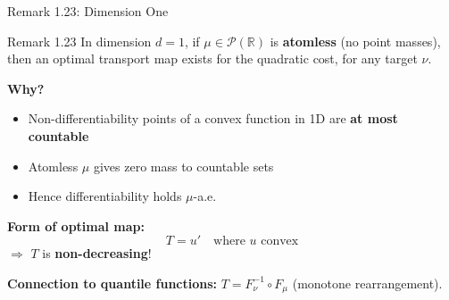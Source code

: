 \documentclass[aspectratio=169]{beamer}
\newcommand{\R}{\mathbb{R}}
\newcommand{\Pp}{\mathcal{P}}
\begin{document}
\begin{frame}{Remark 1.23: Dimension One}
\begin{block}{Remark 1.23}
In dimension $d = 1$, if $\mu \in \Pp(\R)$ is \textbf{atomless} (no point masses), then an optimal transport map exists for the quadratic cost, for any target $\nu$.
\end{block}

\vspace{0.3cm}
\textbf{Why?}
\begin{itemize}
    \item Non-differentiability points of a convex function in 1D are \textbf{at most countable}
    \item Atomless $\mu$ gives zero mass to countable sets
    \item Hence differentiability holds $\mu$-a.e.
\end{itemize}

\vspace{0.3cm}
\textbf{Form of optimal map:}
\[
T = u' \quad \text{where } u \text{ convex}
\]
$\Rightarrow$ $T$ is \textbf{non-decreasing}!

\vspace{0.3cm}
\textbf{Connection to quantile functions:} $T = F_\nu^{-1} \circ F_\mu$ (monotone rearrangement).
\end{frame}
\end{document}
